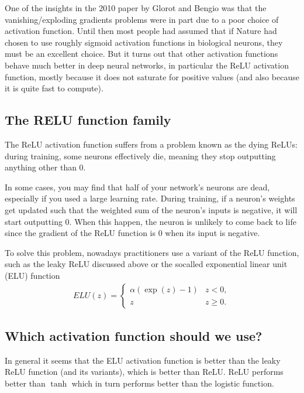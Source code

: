 \documentclass[letterpaper,10pt,english]{sphinxmanual}
\begin{document}
One of the insights in the 2010 paper by Glorot and Bengio was that
the vanishing/exploding gradients problems were in part due to a poor
choice of activation function. Until then most people had assumed that
if Nature had chosen to use roughly sigmoid activation functions in
biological neurons, they must be an excellent choice. But it turns out
that other activation functions behave much better in deep neural
networks, in particular the ReLU activation function, mostly because
it does not saturate for positive values (and also because it is quite
fast to compute).


\subsection{The RELU function family}
\label{\detokenize{chapter6:the-relu-function-family}}
The ReLU activation function suffers from a problem known as the dying
ReLUs: during training, some neurons effectively die, meaning they
stop outputting anything other than 0.

In some cases, you may find that half of your network’s neurons are
dead, especially if you used a large learning rate. During training,
if a neuron’s weights get updated such that the weighted sum of the
neuron’s inputs is negative, it will start outputting 0. When this
happen, the neuron is unlikely to come back to life since the gradient
of the ReLU function is 0 when its input is negative.

To solve this problem, nowadays practitioners use a  variant of the ReLU
function, such as the leaky ReLU discussed above or the so\sphinxhyphen{}called
exponential linear unit (ELU) function
\begin{equation*}
\begin{split}
ELU(z) = \left\{\begin{array}{cc} \alpha\left( \exp{(z)}-1\right) & z < 0,\\  z & z \ge 0.\end{array}\right.
\end{split}
\end{equation*}

\subsection{Which activation function should we use?}
\label{\detokenize{chapter6:which-activation-function-should-we-use}}
In general it seems that the ELU activation function is better than
the leaky ReLU function (and its variants), which is better than
ReLU. ReLU performs better than \(\tanh\) which in turn performs better
than the logistic function.
\end{document}
